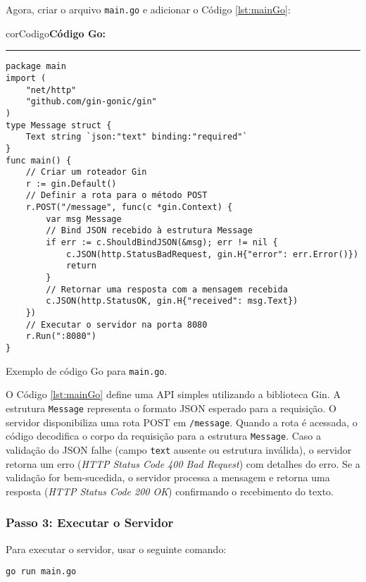 Agora, criar o arquivo \texttt{main.go} e adicionar o Código \ref{lst:mainGo}:

\begin{listing}[!ht]
    \begin{myboxCode}{corCodigo}{\textbf{Código Go: }}\vspace{3mm}
    \hrule
    \begin{verbatim}
package main
import (
    "net/http"
    "github.com/gin-gonic/gin"
)
type Message struct {
    Text string `json:"text" binding:"required"`
}
func main() {
    // Criar um roteador Gin
    r := gin.Default()
    // Definir a rota para o método POST
    r.POST("/message", func(c *gin.Context) {
        var msg Message
        // Bind JSON recebido à estrutura Message
        if err := c.ShouldBindJSON(&msg); err != nil {
            c.JSON(http.StatusBadRequest, gin.H{"error": err.Error()})
            return
        }
        // Retornar uma resposta com a mensagem recebida
        c.JSON(http.StatusOK, gin.H{"received": msg.Text})
    })
    // Executar o servidor na porta 8080
    r.Run(":8080")
}
\end{verbatim}
\end{myboxCode}
\caption{Exemplo de código Go para \texttt{main.go}.}
\label{lst:mainGo}
\end{listing}

O Código \ref{lst:mainGo} define uma API simples utilizando a biblioteca Gin. A estrutura \verb|Message| representa o formato JSON esperado para a requisição. O servidor disponibiliza uma rota POST em \verb|/message|. Quando a rota é acessada, o código decodifica o corpo da requisição para a estrutura \verb|Message|. Caso a validação do JSON falhe (campo \verb|text| ausente ou estrutura inválida), o servidor retorna um erro (\textit{HTTP Status Code 400 Bad Request}) com detalhes do erro. Se a validação for bem-sucedida, o servidor processa a mensagem e retorna uma resposta (\textit{HTTP Status Code 200 OK}) confirmando o recebimento do texto.

\subsubsection{Passo 3: Executar o Servidor}

Para executar o servidor, usar o seguinte comando:

\begin{verbatim}
go run main.go
\end{verbatim}

